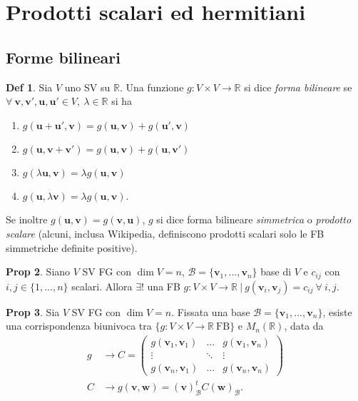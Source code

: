 \documentclass[]{article}
\newcommand{\vu}{\mathbf{u}}
\newcommand{\vv}{\mathbf{v}}
\newcommand{\vw}{\mathbf{w}}
\theoremstyle{definition}
\theoremstyle{definition}
\newtheorem{prop}{Prop}[subsection]
\theoremstyle{definition}
\newtheorem{dfn}[prop]{Def}
\begin{document}
\section{Prodotti scalari ed hermitiani} 
\subsection{Forme bilineari}

\begin{dfn} Sia $V$ uno SV su $\mathbb{R}$. Una funzione $g:V \times V \to \mathbb{R}$ si dice \emph{forma bilineare} se $\forall \ \vv , \vv ' , \vu , \vu ' \in V ,\ \lambda \in \mathbb{R}$ si ha
\begin{enumerate}
	\item $g(\vu + \vu ', \vv) = g(\vu, \vv) + g(\vu ', \vv)$
	\item $g(\vu, \vv + \vv ') = g(\vu, \vv) + g(\vu, \vv ')$
	\item $g(\lambda \vu, \vv) = \lambda g(\vu, \vv)$
	\item $g(\vu, \lambda \vv) = \lambda g(\vu, \vv)$.
\end{enumerate} 
 
Se inoltre $g(\vu  ,\vv ) = g(\vv , \vu )$, $g$ si dice forma bilineare \emph{simmetrica} o \emph{prodotto scalare} (alcuni, inclusa Wikipedia, definiscono prodotti scalari solo le FB simmetriche definite positive).

\end{dfn} \begin{prop} Siano $V$ SV FG con $\dim V = n$, $\mathcal{B}=\{ \vv _1 ,..., \vv _n \}$ base di $V$ e $c_{ij}$ con $i,j \in \{ 1,...,n \}$ scalari. Allora $\exists !$ una FB $g:V \times V \to \mathbb{R} \ | \ g(\vv _i , \vv _j)=c_{ij} \ \forall \ i,j $.

\end{prop} \begin{prop} Sia $V$ SV FG con $\dim V = n$. Fissata una base $\mathcal{B}=\{ \vv _1 ,..., \vv _n \}$, esiste una corrispondenza biunivoca tra $\{ g:V \times V \to \mathbb{R}\ \mathrm{FB}\}$ e $M_n (\mathbb{R})$, data da
\begin{align*}
g &\to C= \begin{pmatrix}
	g(\vv_1,\vv_1)	& ...		& g(\vv_1,\vv_n)	\\
	\vdots			& \ddots	& \vdots			\\
	g(\vv_n,\vv_1)	& ... 		& g(\vv_n,\vv_n)
\end{pmatrix} \\ 
C &\to g(\vv,\vw)=(\vv )_{\mathcal{B}} ^t C (\vw )_{\mathcal{B}}.
\end{align*}


\end{prop}
\end{document}
